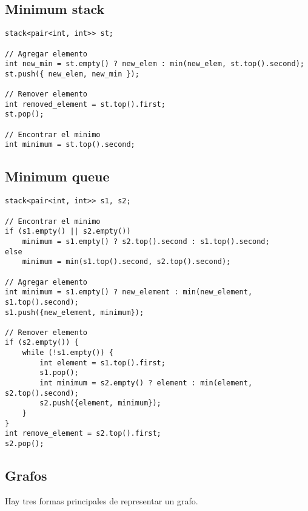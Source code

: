 \documentclass[10pt]{article}
\begin{document}
\subsection{Minimum stack}

\begin{lstlisting}
stack<pair<int, int>> st;

// Agregar elemento
int new_min = st.empty() ? new_elem : min(new_elem, st.top().second);
st.push({ new_elem, new_min });

// Remover elemento
int removed_element = st.top().first;
st.pop();

// Encontrar el minimo
int minimum = st.top().second;
\end{lstlisting}

\subsection{Minimum queue}

\begin{lstlisting}
stack<pair<int, int>> s1, s2;

// Encontrar el minimo
if (s1.empty() || s2.empty()) 
    minimum = s1.empty() ? s2.top().second : s1.top().second;
else
    minimum = min(s1.top().second, s2.top().second);

// Agregar elemento
int minimum = s1.empty() ? new_element : min(new_element, s1.top().second);
s1.push({new_element, minimum});

// Remover elemento
if (s2.empty()) {
    while (!s1.empty()) {
        int element = s1.top().first;
        s1.pop();
        int minimum = s2.empty() ? element : min(element, s2.top().second);
        s2.push({element, minimum});
    }
}
int remove_element = s2.top().first;
s2.pop();
\end{lstlisting}

\subsection{Grafos}

Hay tres formas principales de representar un grafo.
\end{document}
